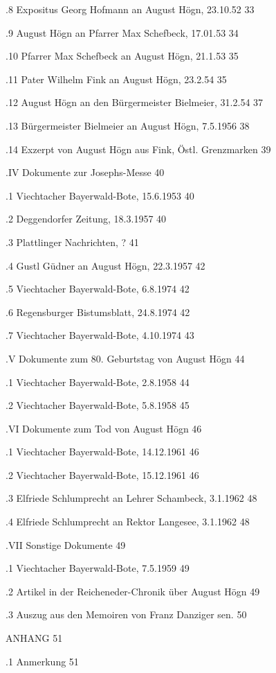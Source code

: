 .8 Expositus Georg Hofmann an August Högn, 23.10.52 33

.9 August Högn an Pfarrer Max Schefbeck, 17.01.53   34

.10 Pfarrer Max Schefbeck an August Högn, 21.1.53   35

.11 Pater Wilhelm Fink an August Högn, 23.2.54  35

.12 August Högn an den Bürgermeister Bielmeier, 31.2.54 37

.13 Bürgermeister Bielmeier an August Högn, 7.5.1956    38

.14 Exzerpt von August Högn aus Fink, Östl. Grenzmarken 39

.IV Dokumente zur Josephs-Messe 40

.1 Viechtacher Bayerwald-Bote, 15.6.1953    40

.2 Deggendorfer Zeitung, 18.3.1957  40

.3 Plattlinger Nachrichten, ?   41

.4 Gustl Güdner an August Högn, 22.3.1957   42

.5 Viechtacher Bayerwald-Bote, 6.8.1974 42

.6 Regensburger Bistumsblatt, 24.8.1974 42

.7 Viechtacher Bayerwald-Bote, 4.10.1974    43

.V Dokumente zum 80. Geburtstag von August Högn 44

.1 Viechtacher Bayerwald-Bote, 2.8.1958     44

.2 Viechtacher Bayerwald-Bote, 5.8.1958 45

.VI Dokumente zum Tod von August Högn   46

.1 Viechtacher Bayerwald-Bote, 14.12.1961   46

.2 Viechtacher Bayerwald-Bote, 15.12.1961   46

.3 Elfriede Schlumprecht an Lehrer Schambeck, 3.1.1962  48

.4 Elfriede Schlumprecht an Rektor Langesee, 3.1.1962   48

.VII Sonstige Dokumente 49

.1 Viechtacher Bayerwald-Bote, 7.5.1959 49

.2 Artikel in der Reicheneder-Chronik über August Högn  49

.3 Auszug aus den Memoiren von Franz Danziger sen.  50

ANHANG  51

.1 Anmerkung    51





